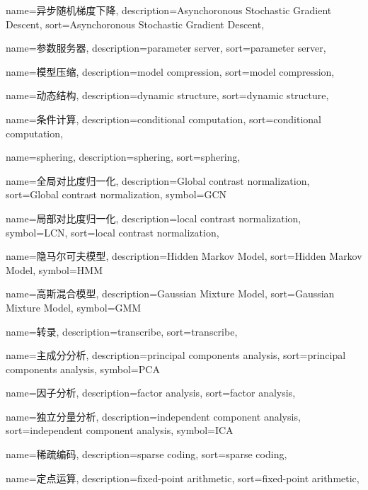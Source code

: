 {
  name=异步随机梯度下降,
  description={Asynchoronous Stochastic Gradient Descent},
  sort={Asynchoronous Stochastic Gradient Descent},
}

{
  name=参数服务器,
  description={parameter server},
  sort={parameter server},
}

{
  name=模型压缩,
  description={model compression},
  sort={model compression},
}

{
  name=动态结构,
  description={dynamic structure},
  sort={dynamic structure},
}

{
  name=条件计算,
  description={conditional computation},
  sort={conditional computation},
}

{
  name=sphering,
  description={sphering},
  sort={sphering},
}

{
  name=全局对比度归一化,
  description={Global contrast normalization},
  sort={Global contrast normalization},
  symbol={GCN}
}

{
  name=局部对比度归一化,
  description={local contrast normalization},
  symbol={LCN},
  sort={local contrast normalization},
}

{
  name=隐马尔可夫模型,
  description={Hidden Markov Model},
  sort={Hidden Markov Model},
  symbol={HMM}
}

{
  name=高斯混合模型,
  description={Gaussian Mixture Model},
  sort={Gaussian Mixture Model},
  symbol={GMM}
}

{
  name=转录,
  description={transcribe},
  sort={transcribe},
}

{
  name=主成分分析,
  description={principal components analysis},
  sort={principal components analysis},
  symbol={PCA}
}

{
  name=因子分析,
  description={factor analysis},
  sort={factor analysis},
}

{
  name=独立分量分析,
  description={independent component analysis},
  sort={independent component analysis},
  symbol={ICA}
}

{
  name=稀疏编码,
  description={sparse coding},
  sort={sparse coding},
}

{
  name=定点运算,
  description={fixed-point arithmetic},
  sort={fixed-point arithmetic},
}


